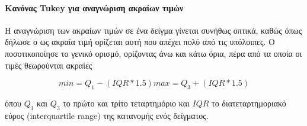 \paragraph{Κανόνας Tukey για αναγνώριση ακραίων τιμών} Η αναγνώριση των ακραίων τιμών σε ένα δείγμα γίνεται συνήθως οπτικά, καθώς όπως δήλωσε ο \citet{Grubbs} ως ακραία τιμή ορίζεται αυτή που απέχει πολύ από τις υπόλοιπες. Ο \citet{Tukey} ποσοτικοποίησε το γενικό ορισμό, ορίζοντας άνω και κάτω όρια, πέρα από τα οποία οι τιμές θεωρούνται ακραίες

\begin{equation}
min =  Q_1 - (IQR * 1.5)
max =  Q_3 + (IQR * 1.5)
\end{equation}

όπου $Q_1$ και $Q_3$ το πρώτο και τρίτο τεταρτημόριο και $IQR$ το διατεταρτημοριακό εύρος (interquartile range) της κατανομής ενός δείγματος. 
